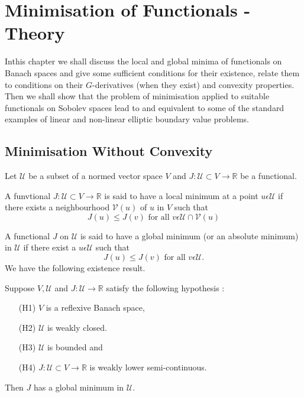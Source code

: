 
\chapter{Minimisation of Functionals - Theory}\label{chap2}
In\pageoriginale this chapter we shall discuss the local and global minima of functionals on Banach spaces and give some sufficient conditions for their existence, relate them to conditions on their $G$-derivatives (when they exist) and convexity properties. Then we shall show that the problem of minimisation applied to suitable functionals on Sobolev spaces lead to and equivalent to some of the standard examples of linear and non-linear elliptic boundary value problems.

\section{Minimisation Without Convexity}\label{chap2-sec1}
Let $\mathcal{U}$ be a subset of a normed vector space $V$ and $J : \mathcal{U} \subset V \to \mathbb{R}$ be a functional.

\begin{definition}\label{chap2-dfe1.1}
A funvtional $J : \mathcal{U} \subset V \to \mathbb{R}$ is said to have a local minimum at a point $u \epsilon \mathcal{U}$ if there exists a neighbourhood $\mathscr{V}(u)$ of $u$ in $V$ such that
$$
J(u) \leq J(v) \text{ for all } v \epsilon \mathcal{U} \cap \mathscr{V}(u)
$$
\end{definition}

\begin{definition}\label{chap2-def1.2}
A functional $J$ on $\mathcal{U}$ is said to have a global minimum (or an absolute minimum) in $\mathcal{U}$ if there exist a $u \epsilon \mathcal{U}$ such that 
$$
J(u) \leq J(v) \text{ for all } v \epsilon \mathcal{U}.
$$
We have the following existence result.
\end{definition}

\begin{theorem}\label{chap2-thm1.1}
Suppose $V, \mathcal{U}$ and $J : \mathcal{U} \to \mathbb{R}$ satisfy the following hypothesis :
\begin{enumerate}
\item[(H1)] $V$ is a reflexive Banach space,
\item[(H2)] $\mathcal{U}$ is weakly closed.
\item[(H3)] $\mathcal{U}$ is bounded and\pageoriginale
\item[(H4)] $J : \mathcal{U} \subset V \to \mathbb{R}$ is weakly lower semi-continuous.
\end{enumerate}
Then $J$ has a global minimum in $\mathcal{U}$.
\end{theorem}

